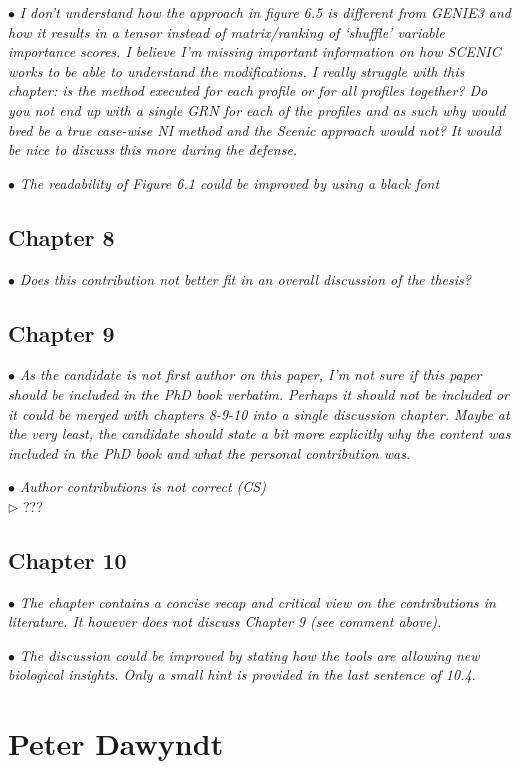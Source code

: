 \documentclass[10pt]{article}
\newcommand{\exam}[2][\  ]{\hspace{0pt}\marginpar{\color{red}#1}$\bullet$ \textit{#2}}
\newcommand{\imp}[1]{{\color{red} #1}}
\newcommand{\nimp}[1]{{\color{gray} #1}}
\newcommand{\answ}[1]{{\color{blue} $\triangleright$ #1}}
\newcommand{\bigexclaim}{\raisebox{-0.1em}{\BigTriangleUp}\hspace{-0.32em}\llap{\small\textbf{!}}\hspace{0.32em}}
\newcommand{\tagimp}{\bigexclaim}
\begin{document}
{\exam{\imp{I don’t understand how the approach in figure 6.5 is different from GENIE3 and
		how it results in a tensor instead of matrix/ranking of ‘shuffle’ variable
		importance scores.} I believe I’m missing important information on how
		SCENIC works to be able to understand the modifications. I really struggle
		with this chapter: is the method executed for each profile or for all profiles
		together? Do you not end up with a single GRN for each of the profiles and as
		such why would bred be a true case-wise NI method and the Scenic approach
		would not? It would be nice to discuss this more during the defense.}


\exam{The readability of Figure 6.1 could be improved by using a black font}
 



\subsection{Chapter 8}
\exam{Does this contribution not better fit in an overall discussion of the thesis?}


\subsection{Chapter 9}
\exam[\tagimp]{\imp{As the candidate is not first author on this paper, I’m not sure if this paper
		should be included in the PhD book verbatim.} Perhaps it should not be
		included or it could be merged with chapters 8-9-10 into a single discussion
		chapter. Maybe at the very least, the candidate should state a bit more
		explicitly why the content was included in the PhD book and what the personal
		contribution was.}

\exam{Author contributions is not correct (CS)} \\
\answ{???}


\subsection{Chapter 10}

\exam{\nimp{The chapter contains a concise recap and critical view on the contributions in
		literature.} It however does not discuss Chapter 9 (see comment above).}


\exam{\imp{The discussion could be improved by stating how the tools are allowing new
		biological insights.} Only a small hint is provided in the last sentence of 10.4.}


\section{Peter Dawyndt}

}
\end{document}
